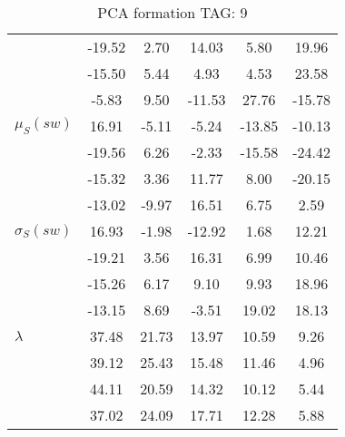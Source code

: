 \begin{table}[h!]
\begin{center}
\begin{tabular}{| l || c | c | c | c | c |}
 & -19.52  & 2.70  & 14.03  & 5.80  & 19.96 \\
 & -15.50  & 5.44  & 4.93  & 4.53  & 23.58 \\
 & -5.83  & 9.50  & -11.53  & 27.76  & -15.78 \\\hline
$\mu_S(sw)$ & 16.91  & -5.11  & -5.24  & -13.85  & -10.13 \\
 & -19.56  & 6.26  & -2.33  & -15.58  & -24.42 \\
 & -15.32  & 3.36  & 11.77  & 8.00  & -20.15 \\
 & -13.02  & -9.97  & 16.51  & 6.75  & 2.59 \\\hline
$\sigma_S(sw)$ & 16.93  & -1.98  & -12.92  & 1.68  & 12.21 \\
 & -19.21  & 3.56  & 16.31  & 6.99  & 10.46 \\
 & -15.26  & 6.17  & 9.10  & 9.93  & 18.96 \\
 & -13.15  & 8.69  & -3.51  & 19.02  & 18.13 \\\hline\hline
$\lambda$ & 37.48  & 21.73  & 13.97  & 10.59  & 9.26 \\
 & 39.12  & 25.43  & 15.48  & 11.46  & 4.96 \\
 & 44.11  & 20.59  & 14.32  & 10.12  & 5.44 \\
 & 37.02  & 24.09  & 17.71  & 12.28  & 5.88 \\\hline
\end{tabular}
\caption{PCA formation TAG: 9}
\end{center}
\end{table}